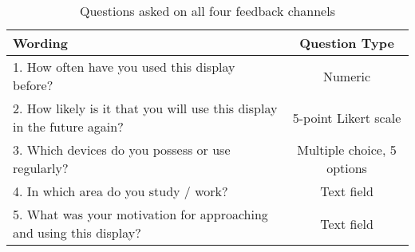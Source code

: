\begin{table}[h]
\begin{tabular}{lc}
\textbf{Wording}                                                     & \textbf{Question Type} \\ \hline
1. How often have you used this display before?                         & Numeric                \\
2. How likely is it that you will use this display in the future again? & 5-point Likert scale   \\
3. Which devices do you possess or use regularly?                       & Multiple choice, 5 options                        \\
4. In which area do you study / work?                                   & Text field             \\
5. What was your motivation for approaching and using this display?     & Text field            
\end{tabular}
\label{table:5-questions-asked}
\caption[Questions asked]{Questions asked on all four feedback channels}
\end{table}